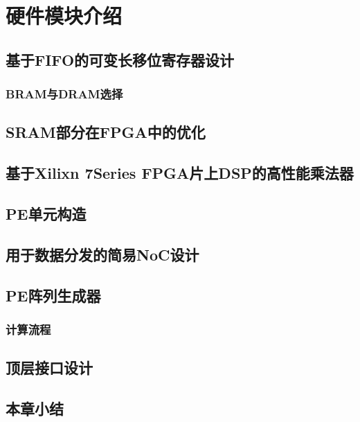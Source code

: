 \chapter{硬件模块介绍}

\section{基于FIFO的可变长移位寄存器设计}

    \subsection{BRAM与DRAM选择}

\section{SRAM部分在FPGA中的优化}

\section{基于Xilixn 7Series FPGA片上DSP的高性能乘法器}

\section{PE单元构造}

\section{用于数据分发的简易NoC设计}

\section{PE阵列生成器}
    \subsection{计算流程}

\section{顶层接口设计}

\section{本章小结}


